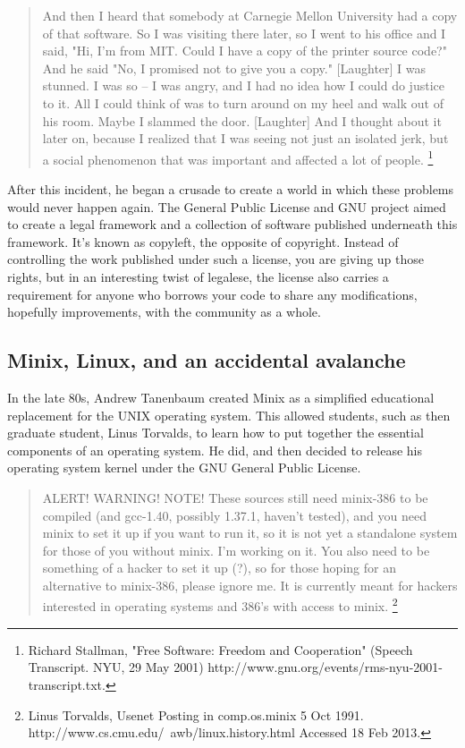 \documentclass[11pt]{article}
\begin{document}
\begin{quote}
And then I heard that somebody at Carnegie Mellon University had a copy
of that software.  So I was visiting there later, so I went to his
office and I said, "Hi, I'm from MIT. Could I have a copy of the printer
source code?"  And he said "No, I promised not to give you a
copy." [Laughter]  I was stunned.  I was so -- I was angry, and I had no
idea how I could do justice to it.  All I could think of was to turn
around on my heel and walk out of his room.  Maybe I slammed the door.
[Laughter] And I thought about it later on, because I realized that I was
seeing not just an isolated jerk, but a social phenomenon that was
important and affected a lot of people.
\footnote{Richard Stallman, "Free Software: Freedom and Cooperation" (Speech Transcript. NYU, 29 May 2001) http://www.gnu.org/events/rms-nyu-2001-transcript.txt.}
\end{quote}

After this incident, he began a crusade to create a world in which these problems would never happen again. The General Public License and GNU project aimed to create a legal framework and a collection of software published underneath this framework. It's known as copyleft, the opposite of copyright. Instead of controlling the work published under such a license, you are giving up those rights, but in an interesting twist of legalese, the license also carries a requirement for anyone who borrows your code to share any modifications, hopefully improvements, with the community as a whole.

\subsection{Minix, Linux, and an accidental avalanche}

In the late 80s, Andrew Tanenbaum created Minix as a simplified educational replacement for the UNIX operating system. This allowed students, such as then graduate student, Linus Torvalds, to learn how to put together the essential components of an operating system. He did, and then decided to release his operating system kernel under the GNU General Public License.

\begin{quote}
ALERT! WARNING! NOTE! These sources still need minix-386 to be compiled
  (and gcc-1.40, possibly 1.37.1, haven't tested), and you need minix to
  set it up if you want to run it, so it is not yet a standalone system
  for those of you without minix. I'm working on it. You also need to be
  something of a hacker to set it up (?), so for those hoping for an
  alternative to minix-386, please ignore me. It is currently meant for
  hackers interested in operating systems and 386's with access to minix.
  \footnote{Linus Torvalds, Usenet Posting in comp.os.minix 5 Oct 1991. http://www.cs.cmu.edu/~awb/linux.history.html Accessed 18 Feb 2013.}\end{quote}
\end{document}
